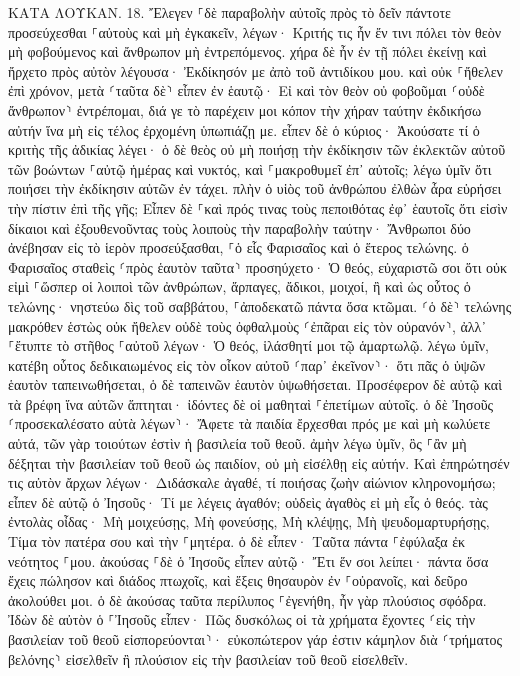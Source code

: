 \documentclass[twoside, 9pt]{extreport}
\begin{document}
ΚΑΤΑ ΛΟΥΚΑΝ.
18.
Ἔλεγεν ⸀δὲ παραβολὴν αὐτοῖς πρὸς τὸ δεῖν πάντοτε προσεύχεσθαι ⸀αὐτοὺς καὶ μὴ ἐγκακεῖν, 
λέγων· Κριτής τις ἦν ἔν τινι πόλει τὸν θεὸν μὴ φοβούμενος καὶ ἄνθρωπον μὴ ἐντρεπόμενος. 
χήρα δὲ ἦν ἐν τῇ πόλει ἐκείνῃ καὶ ἤρχετο πρὸς αὐτὸν λέγουσα· Ἐκδίκησόν με ἀπὸ τοῦ ἀντιδίκου μου. 
καὶ οὐκ ⸀ἤθελεν ἐπὶ χρόνον, μετὰ ⸂ταῦτα δὲ⸃ εἶπεν ἐν ἑαυτῷ· Εἰ καὶ τὸν θεὸν οὐ φοβοῦμαι ⸂οὐδὲ ἄνθρωπον⸃ ἐντρέπομαι, 
διά γε τὸ παρέχειν μοι κόπον τὴν χήραν ταύτην ἐκδικήσω αὐτήν ἵνα μὴ εἰς τέλος ἐρχομένη ὑπωπιάζῃ με. 
εἶπεν δὲ ὁ κύριος· Ἀκούσατε τί ὁ κριτὴς τῆς ἀδικίας λέγει· 
ὁ δὲ θεὸς οὐ μὴ ποιήσῃ τὴν ἐκδίκησιν τῶν ἐκλεκτῶν αὐτοῦ τῶν βοώντων ⸀αὐτῷ ἡμέρας καὶ νυκτός, καὶ ⸀μακροθυμεῖ ἐπ᾽ αὐτοῖς; 
λέγω ὑμῖν ὅτι ποιήσει τὴν ἐκδίκησιν αὐτῶν ἐν τάχει. πλὴν ὁ υἱὸς τοῦ ἀνθρώπου ἐλθὼν ἆρα εὑρήσει τὴν πίστιν ἐπὶ τῆς γῆς; 
Εἶπεν δὲ ⸀καὶ πρός τινας τοὺς πεποιθότας ἐφ᾽ ἑαυτοῖς ὅτι εἰσὶν δίκαιοι καὶ ἐξουθενοῦντας τοὺς λοιποὺς τὴν παραβολὴν ταύτην· 
Ἄνθρωποι δύο ἀνέβησαν εἰς τὸ ἱερὸν προσεύξασθαι, ⸀ὁ εἷς Φαρισαῖος καὶ ὁ ἕτερος τελώνης. 
ὁ Φαρισαῖος σταθεὶς ⸂πρὸς ἑαυτὸν ταῦτα⸃ προσηύχετο· Ὁ θεός, εὐχαριστῶ σοι ὅτι οὐκ εἰμὶ ⸀ὥσπερ οἱ λοιποὶ τῶν ἀνθρώπων, ἅρπαγες, ἄδικοι, μοιχοί, ἢ καὶ ὡς οὗτος ὁ τελώνης· 
νηστεύω δὶς τοῦ σαββάτου, ⸀ἀποδεκατῶ πάντα ὅσα κτῶμαι. 
⸂ὁ δὲ⸃ τελώνης μακρόθεν ἑστὼς οὐκ ἤθελεν οὐδὲ τοὺς ὀφθαλμοὺς ⸂ἐπᾶραι εἰς τὸν οὐρανόν⸃, ἀλλ᾽ ⸀ἔτυπτε τὸ στῆθος ⸀αὐτοῦ λέγων· Ὁ θεός, ἱλάσθητί μοι τῷ ἁμαρτωλῷ. 
λέγω ὑμῖν, κατέβη οὗτος δεδικαιωμένος εἰς τὸν οἶκον αὐτοῦ ⸂παρ᾽ ἐκεῖνον⸃· ὅτι πᾶς ὁ ὑψῶν ἑαυτὸν ταπεινωθήσεται, ὁ δὲ ταπεινῶν ἑαυτὸν ὑψωθήσεται. 
Προσέφερον δὲ αὐτῷ καὶ τὰ βρέφη ἵνα αὐτῶν ἅπτηται· ἰδόντες δὲ οἱ μαθηταὶ ⸀ἐπετίμων αὐτοῖς. 
ὁ δὲ Ἰησοῦς ⸂προσεκαλέσατο αὐτὰ λέγων⸃· Ἄφετε τὰ παιδία ἔρχεσθαι πρός με καὶ μὴ κωλύετε αὐτά, τῶν γὰρ τοιούτων ἐστὶν ἡ βασιλεία τοῦ θεοῦ. 
ἀμὴν λέγω ὑμῖν, ὃς ⸀ἂν μὴ δέξηται τὴν βασιλείαν τοῦ θεοῦ ὡς παιδίον, οὐ μὴ εἰσέλθῃ εἰς αὐτήν. 
Καὶ ἐπηρώτησέν τις αὐτὸν ἄρχων λέγων· Διδάσκαλε ἀγαθέ, τί ποιήσας ζωὴν αἰώνιον κληρονομήσω; 
εἶπεν δὲ αὐτῷ ὁ Ἰησοῦς· Τί με λέγεις ἀγαθόν; οὐδεὶς ἀγαθὸς εἰ μὴ εἷς ὁ θεός. 
τὰς ἐντολὰς οἶδας· Μὴ μοιχεύσῃς, Μὴ φονεύσῃς, Μὴ κλέψῃς, Μὴ ψευδομαρτυρήσῃς, Τίμα τὸν πατέρα σου καὶ τὴν ⸀μητέρα. 
ὁ δὲ εἶπεν· Ταῦτα πάντα ⸀ἐφύλαξα ἐκ νεότητος ⸀μου. 
ἀκούσας ⸀δὲ ὁ Ἰησοῦς εἶπεν αὐτῷ· Ἔτι ἕν σοι λείπει· πάντα ὅσα ἔχεις πώλησον καὶ διάδος πτωχοῖς, καὶ ἕξεις θησαυρὸν ἐν ⸀οὐρανοῖς, καὶ δεῦρο ἀκολούθει μοι. 
ὁ δὲ ἀκούσας ταῦτα περίλυπος ⸀ἐγενήθη, ἦν γὰρ πλούσιος σφόδρα. 
Ἰδὼν δὲ αὐτὸν ὁ ⸀Ἰησοῦς εἶπεν· Πῶς δυσκόλως οἱ τὰ χρήματα ἔχοντες ⸂εἰς τὴν βασιλείαν τοῦ θεοῦ εἰσπορεύονται⸃· 
εὐκοπώτερον γάρ ἐστιν κάμηλον διὰ ⸂τρήματος βελόνης⸃ εἰσελθεῖν ἢ πλούσιον εἰς τὴν βασιλείαν τοῦ θεοῦ εἰσελθεῖν. 
\end{document}
